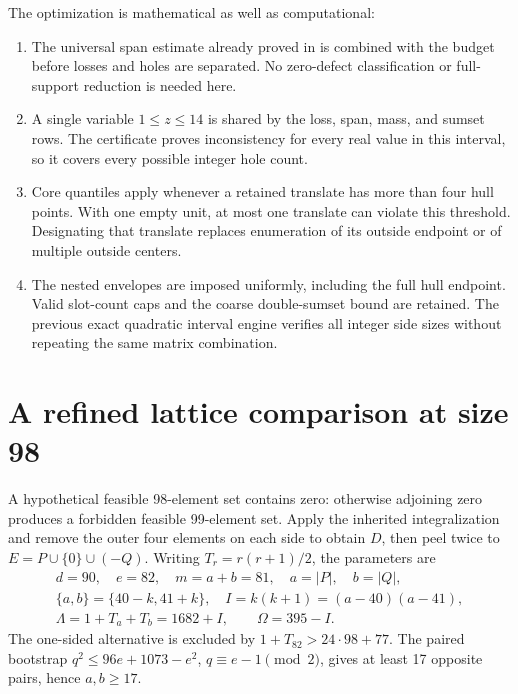 \documentclass[11pt,a4paper]{article}
\begin{document}
The optimization is mathematical as well as computational:
\begin{enumerate}
\item The universal span estimate already proved in \cite{base103} is
combined with the budget before losses and holes are separated. No
zero-defect classification or full-support reduction is needed here.
\item A single variable $1\le z\le14$ is shared by the loss, span, mass,
and sumset rows. The certificate proves inconsistency for every real
value in this interval, so it covers every possible integer hole count.
\item Core quantiles apply whenever a retained translate has more than
four hull points. With one empty unit, at most one translate can violate
this threshold. Designating that translate replaces enumeration of its
outside endpoint or of multiple outside centers.
\item The nested envelopes are imposed uniformly, including the full
hull endpoint. Valid slot-count caps and the coarse double-sumset bound
are retained. The previous exact quadratic interval engine verifies all
integer side sizes without repeating the same matrix combination.
\end{enumerate}

\section{A refined lattice comparison at size 98}
A hypothetical feasible 98-element set contains zero: otherwise adjoining
zero produces a forbidden feasible 99-element set. Apply the inherited
integralization and remove the outer four elements on each side to obtain
$D$, then peel twice to $E=P\cup\{0\}\cup(-Q)$.
Writing $T_r=r(r+1)/2$, the parameters are
\begin{gather*}
 d=90,\quad e=82,\quad m=a+b=81,\quad a=|P|,\quad b=|Q|,\\
 \{a,b\}=\{40-k,41+k\},\quad I=k(k+1)=(a-40)(a-41),\\
 \Lambda=1+T_a+T_b=1682+I,\qquad\Omega=395-I.
\end{gather*}
The one-sided alternative is excluded by $1+T_{82}>24\cdot98+77$.
The paired bootstrap $q^2\le96e+1073-e^2$, $q\equiv e-1\pmod2$,
gives at least 17 opposite pairs, hence $a,b\ge17$.
\end{document}
